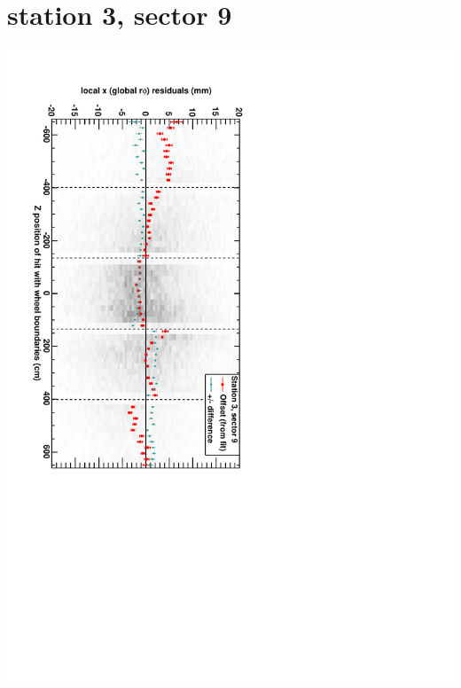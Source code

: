 \documentclass[compress]{beamer}
\begin{document}
\section*{station 3, sector 9}
\begin{frame} \vfill \mbox{\hspace{-1 cm}\includegraphics[height=1.2\linewidth, angle=90]{DTrphiVsZ_st3_sr09.pdf}} \end{frame}
\end{document}
